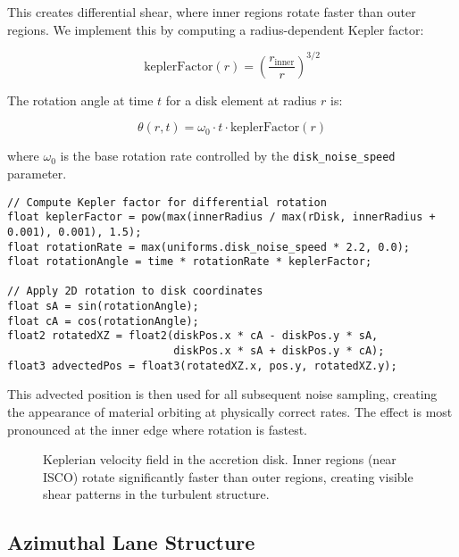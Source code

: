 \documentclass[12pt,a4paper]{article}
\theoremstyle{definition}
\theoremstyle{remark}
\begin{document}
This creates differential shear, where inner regions rotate faster than outer regions. We implement this by computing a radius-dependent Kepler factor:

\begin{equation}
    \text{keplerFactor}(r) = \left(\frac{r_{\text{inner}}}{r}\right)^{3/2}
\end{equation}

The rotation angle at time $t$ for a disk element at radius $r$ is:

\begin{equation}
    \theta(r, t) = \omega_0 \cdot t \cdot \text{keplerFactor}(r)
\end{equation}

where $\omega_0$ is the base rotation rate controlled by the \texttt{disk\_noise\_speed} parameter.

\begin{lstlisting}[style=metalstyle, caption=Keplerian shear implementation]
// Compute Kepler factor for differential rotation
float keplerFactor = pow(max(innerRadius / max(rDisk, innerRadius + 0.001), 0.001), 1.5);
float rotationRate = max(uniforms.disk_noise_speed * 2.2, 0.0);
float rotationAngle = time * rotationRate * keplerFactor;

// Apply 2D rotation to disk coordinates
float sA = sin(rotationAngle);
float cA = cos(rotationAngle);
float2 rotatedXZ = float2(diskPos.x * cA - diskPos.y * sA,
                          diskPos.x * sA + diskPos.y * cA);
float3 advectedPos = float3(rotatedXZ.x, pos.y, rotatedXZ.y);
\end{lstlisting}

This advected position is then used for all subsequent noise sampling, creating the appearance of material orbiting at physically correct rates. The effect is most pronounced at the inner edge where rotation is fastest.

\begin{figure}[H]
    \centering
    \caption{Keplerian velocity field in the accretion disk. Inner regions (near ISCO) rotate significantly faster than outer regions, creating visible shear patterns in the turbulent structure.}
    \label{fig:keplerian_shear}
\end{figure}

\subsection{Azimuthal Lane Structure}
\end{document}
